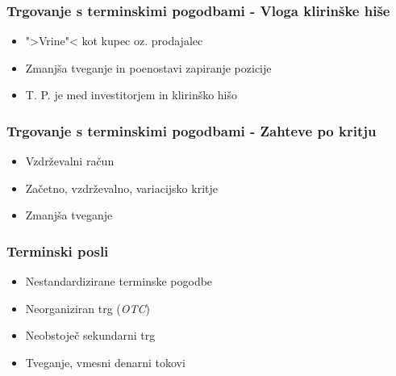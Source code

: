 \documentclass[14pt]{beamer}
\begin{document}
\begin{frame}
    \frametitle{Trgovanje s terminskimi pogodbami - Vloga klirinške hiše}
    
    \begin{itemize}
        \item ">Vrine"< kot kupec oz. prodajalec
        \item Zmanjša tveganje in poenostavi zapiranje pozicije
        \item T. P. je med investitorjem in klirinško hišo
    \end{itemize}


\end{frame}


\begin{frame}
    \frametitle{Trgovanje s terminskimi pogodbami - Zahteve po kritju}
    
    \begin{itemize}
        \item Vzdrževalni račun
        \item Začetno, vzdrževalno, variacijsko kritje
        \item Zmanjša tveganje 
    \end{itemize}


\end{frame}


\begin{frame}
    \frametitle{Terminski posli}
    
    \begin{itemize}
        \item Nestandardizirane terminske pogodbe
        \item Neorganiziran trg (\textit{OTC})
        \item Neobstoječ sekundarni trg
        \item Tveganje, vmesni denarni tokovi
    \end{itemize}


\end{frame}
\end{document}
